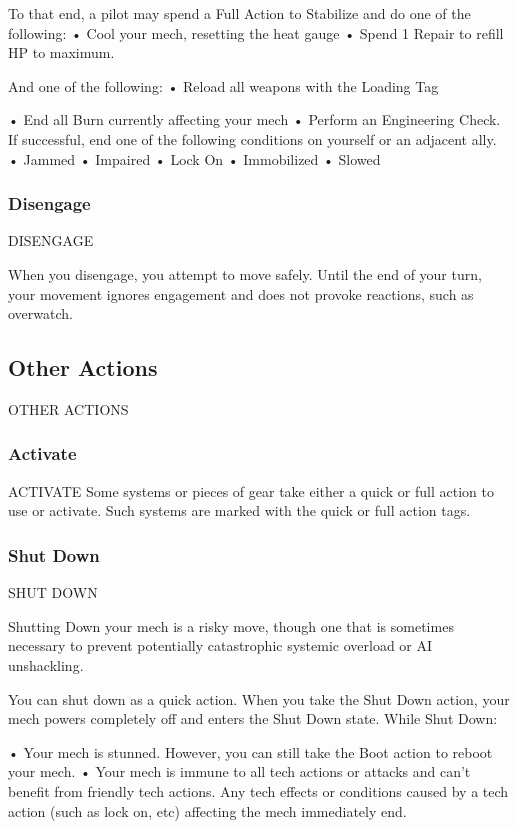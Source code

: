 To that end, a pilot may spend a Full Action to Stabilize and do one of the following:
•  Cool your mech, resetting the heat gauge
•  Spend 1 Repair to refill HP to maximum.

And one of the following:
•  Reload all weapons with the Loading Tag




•  End all Burn currently affecting your mech
•  Perform an Engineering Check. If successful, end one of the following conditions on yourself
  or an adjacent ally.
             •  Jammed
             •  Impaired
             •  Lock On
             •  Immobilized
             •  Slowed

\subsubsection{Disengage}
                                            DISENGAGE

When you disengage, you attempt to move safely. Until the end of your turn, your movement
ignores engagement and does not provoke reactions, such as overwatch.

\subsection{Other Actions} OTHER ACTIONS
\subsubsection{Activate}
                                             ACTIVATE
Some systems or pieces of gear take either a quick or full action to use or activate. Such
systems are marked with the quick or full action tags.

\subsubsection{Shut Down}
                                           SHUT DOWN

Shutting Down your mech is a risky move, though one that is sometimes necessary to prevent
potentially catastrophic systemic overload or AI unshackling.

You can shut down as a quick action. When you take the Shut Down action, your mech powers
completely off and enters the Shut Down state. While Shut Down:

       •  Your mech is stunned. However, you can still take the Boot action to reboot your mech.
       •  Your mech is immune to all tech actions or attacks and can’t benefit from friendly tech
         actions. Any tech effects or conditions caused by a tech action (such as lock on, etc)
         affecting the mech immediately end.

